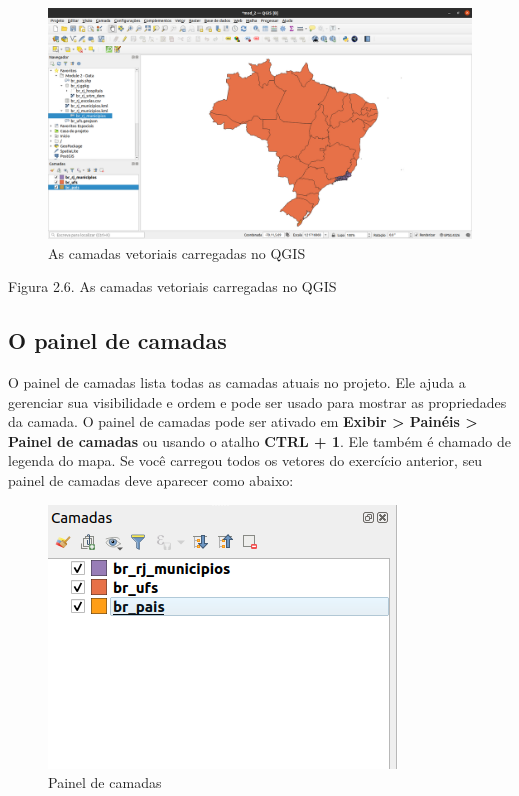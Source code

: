 \documentclass[
  portuguese,
]{krantz}
\begin{document}
\begin{figure}
\centering
\includegraphics{media/modulo2/vector-layers-loaded-1.png}
\caption{As camadas vetoriais carregadas no QGIS}
\end{figure}

Figura 2.6. As camadas vetoriais carregadas no QGIS

\hypertarget{o-painel-de-camadas}{%
\subsection{\texorpdfstring{\textbf{O painel de camadas}}{O painel de camadas}}\label{o-painel-de-camadas}}

O painel de camadas lista todas as camadas atuais no projeto. Ele ajuda a gerenciar sua visibilidade e ordem e pode ser usado para mostrar as propriedades da camada. O painel de camadas pode ser ativado em \textbf{Exibir \textgreater{} Painéis \textgreater{} Painel de camadas} ou usando o atalho \textbf{CTRL + 1}. Ele também é chamado de legenda do mapa. Se você carregou todos os vetores do exercício anterior, seu painel de camadas deve aparecer como abaixo:

\begin{figure}
\centering
\includegraphics{media/modulo2/layers-panel-1.png}
\caption{Painel de camadas}
\end{figure}
\end{document}
